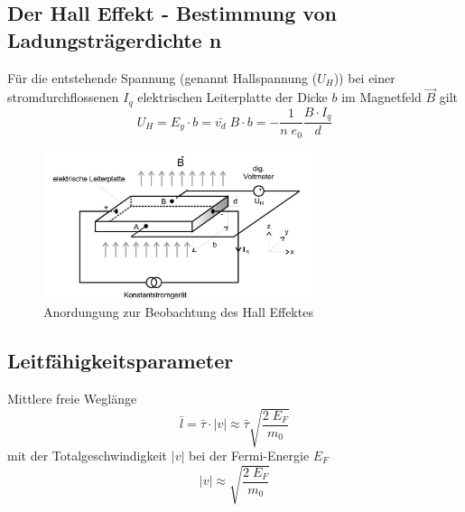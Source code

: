 \subsection{Der Hall Effekt - Bestimmung von Ladungsträgerdichte n}
Für die entstehende Spannung (genannt Hallspannung ($U_H$)) bei einer stromdurchflossenen $I_q$
elektrischen Leiterplatte der Dicke $b$ im Magnetfeld $\vec{B}$ gilt
\begin{equation}
    U_H=E_y \cdot b = \bar{v_d}\;B\cdot b = -\frac{1}{n \; e_0}\frac{B \cdot I_q}{d}
    \label{eqn:U_Hall}
\end{equation}
\begin{figure}[H]
    \centering
    \includegraphics[width=0.7\textwidth]{bilder/HAll.jpg}
    \caption{Anordungung zur Beobachtung des Hall Effektes \cite[265]{Anleitung}}
    \label{fig:hall}
\end{figure}



\subsection{Leitfähigkeitsparameter}
Mittlere freie Weglänge 
\begin{equation}
    \bar{l}=\bar{\tau} \cdot |v| \approx \bar{\tau}\sqrt{\frac{2\;E_F}{m_0}}  
\end{equation}
mit der Totalgeschwindigkeit $|v|$ bei der Fermi-Energie $E_F$
\begin{equation}
    |v|\approx \sqrt{\frac{2\;E_F}{m_0}}    
\end{equation} 






